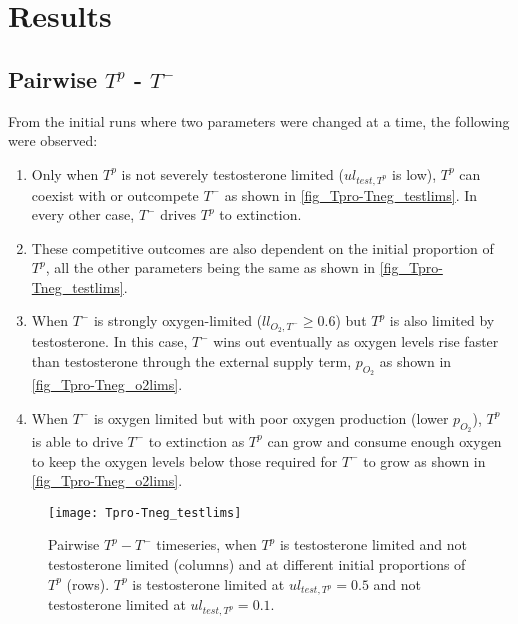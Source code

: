 \chapter{Results}

\section{Pairwise $T^p$ - $T^-$}
From the initial runs where two parameters were changed at a time, the following were observed:
\begin{enumerate}
  \item Only when $T^p$ is not severely testosterone limited ($ul_{test,T^p}$ is low), $T^p$ can coexist with or outcompete $T^-$ as shown in \autoref{fig_Tpro-Tneg_testlims}. In every other case, $T^-$ drives $T^p$ to extinction.
  \item These competitive outcomes are also dependent on the initial proportion of $T^p$, all the other parameters being the same as shown in  \autoref{fig_Tpro-Tneg_testlims}.
  \item  When $T^-$ is strongly oxygen-limited ($ll_{O_2,T^-} \geq 0.6$) but $T^p$ is also limited by testosterone. In this case, $T^-$ wins out eventually as oxygen levels rise faster than testosterone through the external supply term, $p_{O_2}$ as shown in \autoref{fig_Tpro-Tneg_o2lims}.
  \item When $T^-$ is oxygen limited but with poor oxygen production (lower $p_{O_2}$), $T^p$ is able to drive $T^-$ to extinction as $T^p$ can grow and consume enough oxygen to keep the oxygen levels below those required for $T^-$ to grow as shown in \autoref{fig_Tpro-Tneg_o2lims}.
\end{enumerate}

\begin{figure}[h!]
  \centering
  \texttt{[image: Tpro-Tneg\_testlims]}
  \caption[Pairwise $T^p - T^-$ timeseries, testosterone limitation]{Pairwise $T^p - T^-$ timeseries, when $T^p$ is testosterone limited and not testosterone limited (columns) and at different initial proportions of $T^p$ (rows). $T^p$ is testosterone limited at $ul_{test,T^p}=0.5$ and not testosterone limited at $ul_{test,T^p}=0.1$.}
  \label{fig_Tpro-Tneg_testlims}
\end{figure}

